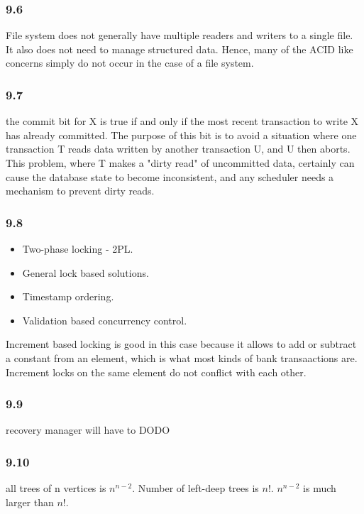 \documentclass{article}
\begin{document}
\subsubsection{9.6}
File system does not generally have multiple readers and writers to a single
file. It also does not need to manage structured data. Hence, many of the ACID
like concerns simply do not occur in the case of a file system.

\subsubsection{9.7}
the commit bit for X is true if and only if the most recent
transaction to write X has already committed. The purpose of this bit
is to avoid a situation where one transaction T reads data written by
another transaction U, and U then aborts. This problem, where T makes
a "dirty read" of uncommitted data, certainly can cause the database
state to become inconsistent, and any scheduler needs a mechanism to
prevent dirty reads.

\subsubsection{9.8}
\begin{itemize}
        \item  Two-phase locking - 2PL.
        \item General lock based solutions.
        \item Timestamp ordering.
        \item Validation based concurrency control.
\end{itemize}

Increment based locking is good in this case because it allows to add or subtract a constant
from an element, which is what most kinds of bank transaactions are. Increment locks on the same
element do not conflict with each other.
\subsubsection{9.9}
recovery manager will have to DODO
\subsubsection{9.10}
all trees of n vertices is $n^{n-2}$. Number of left-deep trees is $n!$.
$n^{n-2}$ is much larger than $n!$.
\end{document}
